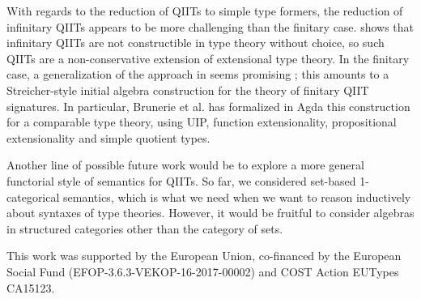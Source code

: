 \documentclass[sigplan,review,anonymous]{acmart}\settopmatter{printfolios=true,printccs=false,printacmref=false}
\begin{document}
With regards to the reduction of QIITs to simple type formers, the
reduction of infinitary QIITs appears to be more challenging than the finitary
case. \cite[Section 9]{lumsdaineShulman} shows that infinitary QIITs are not
constructible in type theory without choice, so such QIITs are a
non-conservative extension of extensional type theory. In the finitary case, a
generalization of the approach in \cite{induction-is-enough} seems promising ;
this amounts to a Streicher-style initial algebra construction
\cite{streicher2012semantics} for the theory of finitary QIIT signatures. In
particular, Brunerie et al. \cite{brunerie} has formalized in Agda this
construction for a comparable type theory, using UIP, function extensionality,
propositional extensionality and simple quotient types.

Another line of possible future work would be to explore a more general
functorial style of semantics for QIITs. So far, we considered set-based
1-categorical semantics, which is what we need when we want to reason
inductively about syntaxes of type theories. However, it would be fruitful to
consider algebras in structured categories other than the category of sets.


\begin{acks}
This work was supported by the European Union, co-financed by the
European Social Fund (EFOP-3.6.3-VEKOP-16-2017-00002) and COST Action
EUTypes CA15123.
\end{acks}



\end{document}
